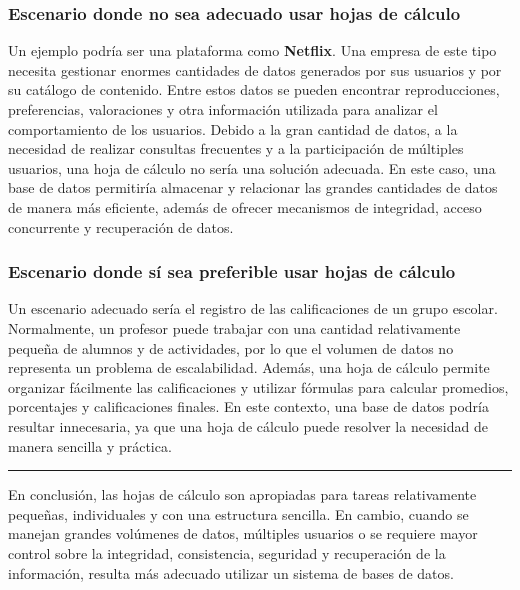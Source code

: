 \vspace{0.3cm}

\subsubsection*{\textcolor{unamblue}{Escenario donde no sea adecuado usar hojas de cálculo}}

Un ejemplo podría ser una plataforma como \textbf{Netflix}. Una empresa de este tipo necesita gestionar enormes cantidades de datos generados por sus usuarios y por su catálogo de contenido. Entre estos datos se pueden encontrar reproducciones, preferencias, valoraciones y otra información utilizada para analizar el comportamiento de los usuarios. Debido a la gran cantidad de datos, a la necesidad de realizar consultas frecuentes y a la participación de múltiples usuarios, una hoja de cálculo no sería una solución adecuada. En este caso, una base de datos permitiría almacenar y relacionar las grandes cantidades de datos de manera más eficiente, además de ofrecer mecanismos de integridad, acceso concurrente y recuperación de datos.

\vspace{0.3cm}

\subsubsection*{\textcolor{unamblue}{Escenario donde sí sea preferible usar hojas de cálculo}}

Un escenario adecuado sería el registro de las calificaciones de un grupo escolar. Normalmente, un profesor puede trabajar con una cantidad relativamente pequeña de alumnos y de actividades, por lo que el volumen de datos no representa un problema de escalabilidad. Además, una hoja de cálculo permite organizar fácilmente las calificaciones y utilizar fórmulas para calcular promedios, porcentajes y calificaciones finales. En este contexto, una base de datos podría resultar innecesaria, ya que una hoja de cálculo puede resolver la necesidad de manera sencilla y práctica.

\vspace{0.3cm}

\noindent
\textcolor{unamblue}{\rule{\textwidth}{1.2pt}}

\vspace{0.3cm}

En conclusión, las hojas de cálculo son apropiadas para tareas relativamente pequeñas, individuales y con una estructura sencilla. En cambio, cuando se manejan grandes volúmenes de datos, múltiples usuarios o se requiere mayor control sobre la integridad, consistencia, seguridad y recuperación de la información, resulta más adecuado utilizar un sistema de bases de datos.
